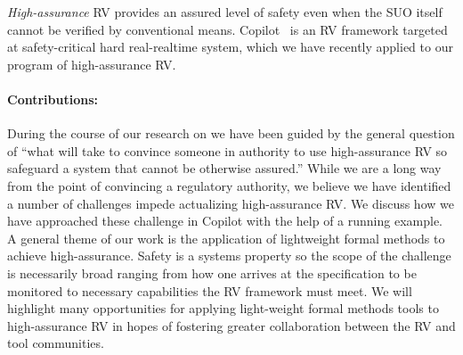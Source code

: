 \emph{High-assurance} RV provides an assured level of safety even when
the SUO itself cannot be verified  by conventional
means. Copilot~\cite{copilot, pike-isse-13} is an RV framework
targeted at safety-critical hard real-realtime system, which we have
recently applied to our program of high-assurance RV.  


\paragraph{Contributions:} During the course of our research on we
have been guided by the general question of ``what will take to
convince someone in authority to use high-assurance RV so safeguard a
system that cannot be otherwise assured.''  While we are a long way
from the point of convincing a regulatory authority, we believe we
have identified a number of challenges impede actualizing
high-assurance RV.  We discuss how we have approached these challenge
in Copilot with the help of a running example. A general theme of our
work is the application of lightweight formal methods to achieve
high-assurance.  Safety is a systems property so the scope of the
challenge is necessarily broad ranging from how one arrives at the
specification to be monitored to necessary capabilities the RV
framework must meet. We will highlight many opportunities for applying
light-weight formal methods tools to high-assurance RV in hopes of
fostering greater collaboration between the RV and tool communities.

